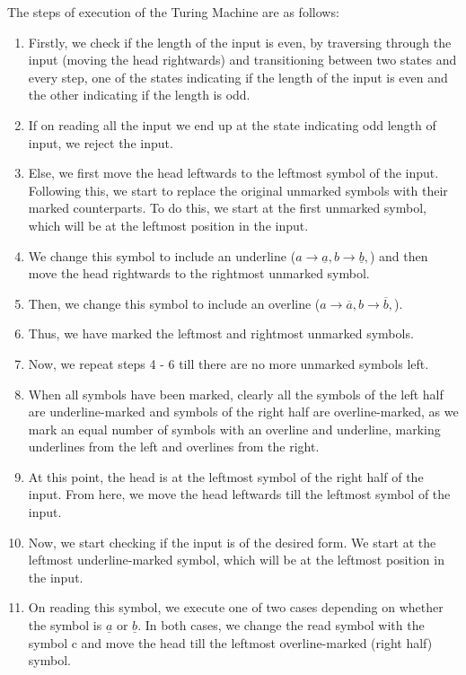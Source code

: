 \documentclass[12pt,a4paper]{article}
\begin{document}
The steps of execution of the Turing Machine are as follows:
\begin{enumerate}
    \item Firstly, we check if the length of the input is even, by traversing through the input (moving the head rightwards) and transitioning between two states and every step, one of the states indicating if the length of the input is even and the other indicating if the length is odd.
    \item If on reading all the input we end up at the state indicating odd length of input, we reject the input.
    \item Else, we first move the head leftwards to the leftmost symbol of the input. Following this, we start to replace the original unmarked symbols with their marked counterparts. To do this, we start at the first unmarked symbol, which will be at the leftmost position in the input.
    \item We change this symbol to include an underline ($a \rightarrow \underline{a}, b \rightarrow \underline{b},$) and then move the head rightwards to the rightmost unmarked symbol. 
    \item Then, we change this symbol to include an overline ($a \rightarrow \overline{a}, b \rightarrow \overline{b},$).
    \item Thus, we have marked the leftmost and rightmost unmarked symbols.
    \item Now, we repeat steps 4 - 6 till there are no more unmarked symbols left.
    \item When all symbols have been marked, clearly all the symbols of the left half are underline-marked and symbols of the right half are overline-marked, as we mark an equal number of symbols with an overline and underline, marking underlines from the left and overlines from the right.
    \item At this point, the head is at the leftmost symbol of the right half of the input. From here, we move the head leftwards till the leftmost symbol of the input. 
    \item Now, we start checking if the input is of the desired form. We start at the leftmost underline-marked symbol, which will be at the leftmost position in the input. 
    \item On reading this symbol, we execute one of two cases depending on whether the symbol is $\underline{a}$ or $\underline{b}$. In both cases, we change the read symbol with the symbol c and move the head till the leftmost overline-marked (right half) symbol.

\end{enumerate}
\end{document}
